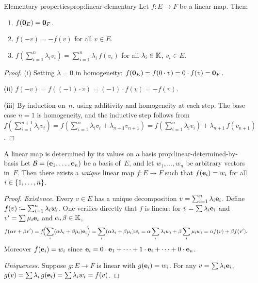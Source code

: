 \begin{proposition}{Elementary properties}{prop:linear-elementary}
Let $f\colon E\to F$ be a linear map. Then:
\begin{enumerate}[label=(\roman*)]
  \item $f(\mathbf{0}_E) = \mathbf{0}_F$.
  \item $f(-v) = -f(v)$ for all $v\in E$.
  \item $f\!\left(\sum_{i=1}^{n} \lambda_i v_i\right)
    = \sum_{i=1}^{n} \lambda_i\, f(v_i)$
    for all $\lambda_i\in{\mathbb{K}}$, $v_i\in E$.
\end{enumerate}
\end{proposition}

\begin{proof}
(i) Setting $\lambda = 0$ in homogeneity: $f(\mathbf{0}_E) = f(0\cdot v) =
0\cdot f(v) = \mathbf{0}_F$.

(ii) $f(-v) = f((-1)\cdot v) = (-1)\cdot f(v) = -f(v)$.

(iii) By induction on~$n$, using additivity and homogeneity at each step.
The base case $n=1$ is homogeneity, and the inductive step follows from
$f\!\left(\sum_{i=1}^{n+1}\lambda_i v_i\right)
= f\!\left(\sum_{i=1}^{n}\lambda_i v_i + \lambda_{n+1}v_{n+1}\right)
= f\!\left(\sum_{i=1}^{n}\lambda_i v_i\right) + \lambda_{n+1}\,f(v_{n+1})$.
\end{proof}

\begin{proposition}{A linear map is determined by its values on a basis}%
{prop:linear-determined-by-basis}
Let ${\mathcal{B}} = (\mathbf{e}_{1},\ldots,\mathbf{e}_{n})$ be a basis of~$E$, and let
$w_1,\ldots,w_n$ be arbitrary vectors in~$F$. Then there exists a
\emph{unique} linear map $f\colon E\to F$ such that
$f(\mathbf{e}_{i}) = w_i$ for all $i\in\left\{1,\ldots,n\right\}$.
\end{proposition}

\begin{proof}
\textit{Existence.}\; Every $v\in E$ has a unique decomposition
$v = \sum_{i=1}^{n}\lambda_i\mathbf{e}_{i}$. Define
$f(v) \coloneqq \sum_{i=1}^{n}\lambda_i w_i$.
One verifies directly that $f$ is linear: for
$v = \sum \lambda_i \mathbf{e}_{i}$ and $v' = \sum \mu_i \mathbf{e}_{i}$ and
$\alpha,\beta\in{\mathbb{K}}$,
\[
  f(\alpha v + \beta v')
  = f\!\Bigl(\sum_{i}(\alpha\lambda_i+\beta\mu_i)\mathbf{e}_{i}\Bigr)
  = \sum_{i}(\alpha\lambda_i+\beta\mu_i)w_i
  = \alpha\sum_{i}\lambda_i w_i + \beta\sum_{i}\mu_i w_i
  = \alpha f(v)+\beta f(v').
\]
Moreover $f(\mathbf{e}_{i}) = w_i$ since
$\mathbf{e}_{i} = 0\cdot\mathbf{e}_{1}+\cdots+1\cdot\mathbf{e}_{i}+\cdots+0\cdot\mathbf{e}_{n}$.

\textit{Uniqueness.}\; Suppose $g\colon E\to F$ is linear with
$g(\mathbf{e}_{i}) = w_i$. For any $v = \sum \lambda_i\mathbf{e}_{i}$,
$g(v) = \sum \lambda_i\, g(\mathbf{e}_{i}) = \sum \lambda_i w_i = f(v)$.
\end{proof}


